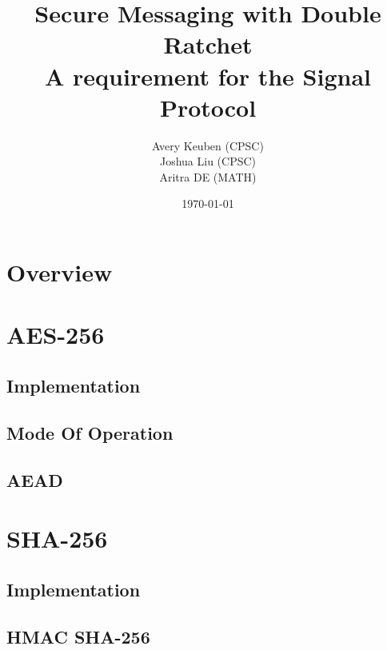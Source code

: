 

\title{Secure Messaging with Double Ratchet\\ A requirement for the Signal Protocol}
\author{Avery Keuben (CPSC)\\ Joshua Liu (CPSC)\\ Aritra DE (MATH)}
\date{\today}
  


\maketitle

\newpage

\section{Overview}


\section{AES-256}


\subsection{Implementation}


\subsection{Mode Of Operation}


\subsection{AEAD}


\section{SHA-256}


\subsection{Implementation}


\subsection{HMAC SHA-256}


